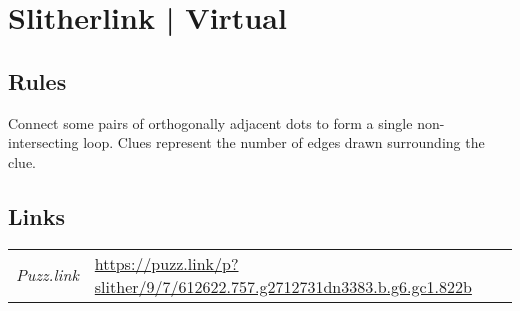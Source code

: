 \section[Slitherlink | Virtual {[\emph{Slitherlink}]}]{Slitherlink | {\normalfont Virtual}}
\label{sec:58-slitherlink-virtual}

\subsection*{Rules}
\begin{markdown}
Connect some pairs of orthogonally adjacent dots to form a single non-intersecting loop. Clues represent the number of edges drawn surrounding the clue.
\end{markdown}
\subsection*{Links}
\begin{tabularx}{\textwidth}{l X}
\emph{Puzz.link} & \url{https://puzz.link/p?slither/9/7/612622.757.g2712731dn3383.b.g6.gc1.822b} \\
\end{tabularx}
\pagebreak
